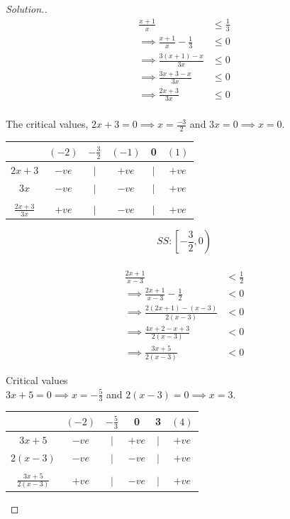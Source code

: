 \documentclass[11pt,a4paper]{article}
\theoremstyle{definition}
\newenvironment{solution}
  {\renewcommand{\qedsymbol}{}\begin{proof}[\textit{Solution}.]}
  {\end{proof}}
\begin{document}
\begin{solution}

\begin{align*}
\frac{x+1}{x} & \leq \frac{1}{3}\\
\implies \frac{x+1}{x}-\frac{1}{3} & \leq 0\\
\implies \frac{3(x+1)-x}{3x} & \leq 0\\
\implies \frac{3x+3-x}{3x} & \leq 0\\
\implies \frac{2x+3}{3x} & \leq 0\\
\end{align*}


The critical values, $2x+3=0\implies x=\frac{-3}{2}$ and $3x=0\implies x=0$.

\begin{table}[H]
\centering
\begin{tabular}{cccccc}
& $(-2)$ & $-\frac{3}{2}$ & $(-1)$ & 0 & $(1)$\\
\hline
\multicolumn{1}{c|}{$2x+3$}  & $-ve$ & $|$ & $+ve$ & $|$ & $+ve$\\
\multicolumn{1}{c|}{$3x$}    & $-ve$ & $|$ & $-ve$ & $|$ & $+ve$\\
\multicolumn{1}{c|}{}&&&&&\\
\multicolumn{1}{c|}{$\frac{2x+3}{3x}$}  & $+ve$ & $|$ & $-ve$ & $|$ & $+ve$\\
\end{tabular}
\end{table}

$$SS:\left[-\frac{3}{2},0\right)$$\\

\begin{align*}
\frac{2x+1}{x-3} & < \frac{1}{2}\\
\implies \frac{2x+1}{x-3}-\frac{1}{2} & <0\\
\implies \frac{2(2x+1)-(x-3)}{2(x-3)} & <0\\
\implies \frac{4x+2-x+3}{2(x-3)} & <0\\
\implies \frac{3x+5}{2(x-3)} & <0
\end{align*}

Critical values\\
$3x+5=0\implies x=-\frac{5}{3}$ and $2(x-3)=0\implies x=3$.




\begin{table}[H]
\centering
\begin{tabular}{cccccc}
& $(-2)$ & $-\frac{5}{3}$ & 0 & 3 & $(4)$\\
\hline
\multicolumn{1}{c|}{$3x+5$} & $-ve$ & $|$ & $+ve$ & $|$ & $+ve$\\
\multicolumn{1}{c|}{$2(x-3)$}  & $-ve$ & $|$ & $-ve$ & $|$ & $+ve$\\
\multicolumn{1}{c|}{}&&&&&\\
\multicolumn{1}{c|}{$\frac{3x+5}{2(x-3)}$} & $+ve$ & $|$ & $-ve$ & $|$ & $+ve$\\
\end{tabular}
\end{table}


\end{solution}
\end{document}
